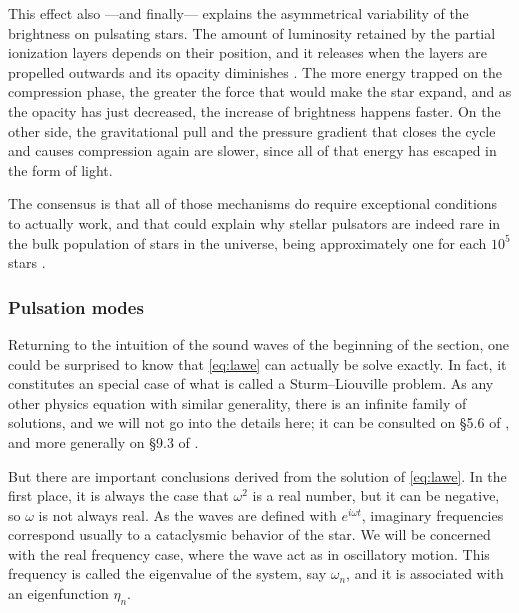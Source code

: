 	This effect also ---and finally--- explains the asymmetrical variability of the brightness on pulsating stars.
	The amount of luminosity retained by the partial ionization layers depends on their position,
	and it releases when the layers are propelled outwards and its opacity diminishes \citep{Carroll2017}.
	The more energy trapped on the compression phase, the greater the force that would make the star expand,
	and as the opacity has just decreased, the increase of brightness happens faster.
	On the other side, the gravitational pull and the pressure gradient that closes the cycle and causes compression again
	are slower, since all of that energy has escaped in the form of light. 
	
	
	
	The consensus is that all of those mechanisms do require exceptional conditions to actually work, 
	and that could explain why stellar pulsators are indeed rare in the bulk population of stars in the universe,
	being approximately one for each $10^5$ stars \citep{Carroll2017}.
	
	\subsubsection{Pulsation modes}
	
	
	Returning to the intuition of the sound waves of the beginning of the section,
	one could be surprised to know that \autoref{eq:lawe} can actually be solve exactly.
	In fact, it constitutes an special case of what is called a Sturm–Liouville problem.
	As any other physics equation with similar generality, there is an infinite family of solutions,
	and we will not go into the details here; it can be consulted on \S 5.6 of \cite{Catelan2015},
	and more generally on \S  9.3 of \cite{Butkov1968}.
	
	But there are important conclusions derived from the solution of \autoref{eq:lawe}.
	In the first place, it is always the case that $\omega^2$ is a real number, but it can be negative, so $\omega$ is not always real.
	As the waves are defined with $e^{i \omega t}$, imaginary frequencies correspond usually to a cataclysmic behavior of the star.
	We will be concerned with the real frequency case, where the wave act as in oscillatory motion.
	This frequency is called the eigenvalue of the system, say $\omega_n$, and it is associated with an eigenfunction $\eta_n$.
	
